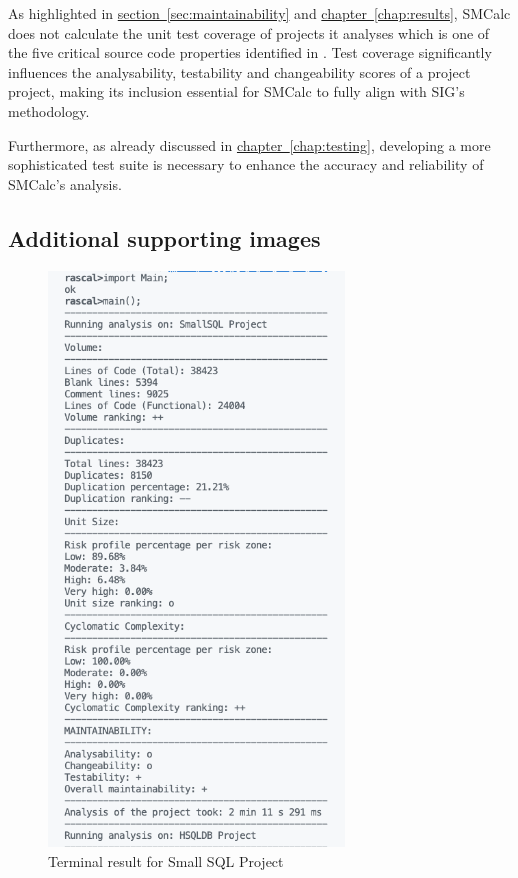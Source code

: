 \documentclass[11pt]{report}
\newcommand{\lnautoref}[1]{\hyperref[#1]{chapter~\ref{#1}}}
\newcommand{\lnsection}[1]{\hyperref[#1]{section~\ref{#1}}}
\begin{document}
As highlighted in \lnsection{sec:maintainability} and \lnautoref{chap:results}, SMCalc does not calculate the unit test coverage of projects it analyses which is one of the five critical source code properties identified in \cite{Heitlager2007}. Test coverage significantly influences the analysability, testability and changeability scores of a project project, making its inclusion essential for SMCalc to fully align with SIG's methodology.

Furthermore, as already discussed in \lnautoref{chap:testing}, developing a more sophisticated test suite is necessary to enhance the accuracy and reliability of SMCalc's analysis.

\printbibliography[heading=bibintoc]

\newpage
\begin{appendices}
\chapter{Additional supporting images}
\label{app:A}

\begin{figure}[h!]
    \centering
    \includegraphics[width=0.7\textwidth]{images/small_sql.png}
    \caption{Terminal result for Small SQL Project}
    \label{fig:small-sql}
\end{figure}


\end{appendices}
\end{document}
